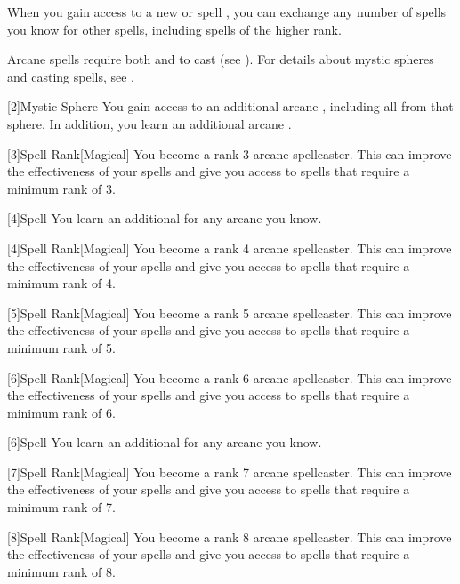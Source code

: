         When you gain access to a new  or spell ,
            you can exchange any number of spells you know for other spells,
            including spells of the higher rank.

        Arcane spells require both  and  to cast (see ).
        For details about mystic spheres and casting spells, see .

        [2]{Mystic Sphere} You gain access to an additional arcane , including all  from that sphere.
        In addition, you learn an additional arcane .

        [3]{Spell Rank}[Magical] You become a rank 3 arcane spellcaster.
        This can improve the effectiveness of your spells and give you access to spells that require a minimum rank of 3.

        [4]{Spell} You learn an additional  for any arcane  you know.

        [4]{Spell Rank}[Magical] You become a rank 4 arcane spellcaster.
        This can improve the effectiveness of your spells and give you access to spells that require a minimum rank of 4.

        [5]{Spell Rank}[Magical] You become a rank 5 arcane spellcaster.
        This can improve the effectiveness of your spells and give you access to spells that require a minimum rank of 5.

        [6]{Spell Rank}[Magical] You become a rank 6 arcane spellcaster.
        This can improve the effectiveness of your spells and give you access to spells that require a minimum rank of 6.

        [6]{Spell} You learn an additional  for any arcane  you know.

        [7]{Spell Rank}[Magical] You become a rank 7 arcane spellcaster.
        This can improve the effectiveness of your spells and give you access to spells that require a minimum rank of 7.

        [8]{Spell Rank}[Magical] You become a rank 8 arcane spellcaster.
        This can improve the effectiveness of your spells and give you access to spells that require a minimum rank of 8.

